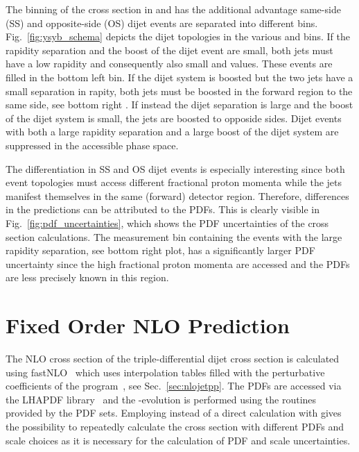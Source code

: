 The binning of the cross section in \ystar and \yboost has the additional
advantage same-side (SS) and opposite-side (OS) dijet events are separated into
different bins. Fig.~\ref{fig:ysyb_schema} depicts the dijet topologies in the
various \ystar and \yboost bins. If the rapidity separation and the boost of the
dijet event are small, both jets must have a low rapidity and consequently also
small \ystar and \yboost values. These events are filled in the bottom left bin.
If the dijet system is boosted but the two jets have a small separation in
rapity, both jets must be boosted in the forward region to the same side, see
bottom right . If instead the dijet separation is large and the boost of the
dijet system is small, the jets are boosted to opposide sides. Dijet events with
both a large rapidity separation and a large boost of the dijet system are
suppressed in the accessible phase space.

The differentiation in SS and OS dijet events is especially interesting since
both event topologies must access different fractional proton momenta while the
jets manifest themselves in the same (forward) detector region. Therefore,
differences in the predictions can be attributed to the PDFs. This is clearly
visible in Fig.~\ref{fig:pdf_uncertainties}, which shows the PDF uncertainties of
the cross section calculations. The measurement bin containing the events with
the large rapidity separation, see bottom right plot, has a significantly larger
PDF uncertainty since the high fractional proton momenta are accessed and the
PDFs are less precisely known in this region.

\section{Fixed Order NLO Prediction}

The NLO cross section of the triple-differential dijet cross section is
calculated using fastNLO~\cite{Kluge:2006xs,Britzger:2012bs} which uses
interpolation tables filled with the perturbative coefficients of the \NLOJETPP
program~\cite{Nagy:2003tz}, see Sec.~\ref{sec:nlojetpp}. The PDFs are accessed
via the LHAPDF library~\cite{Whalley:2005nh,Buckley:2014ana} and the
\as-evolution is performed using the routines provided by the PDF sets.
Employing \fastNLO instead of a direct calculation with \NLOJETPP gives the
possibility to repeatedly calculate the cross section with  different PDFs and
scale choices as it is necessary for the calculation of PDF and scale
uncertainties.

